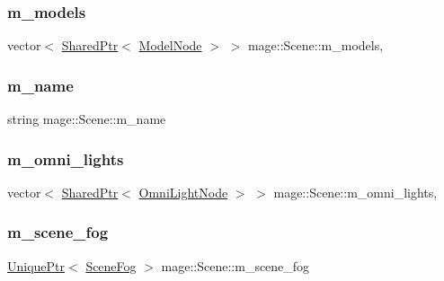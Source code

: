 \subsubsection{\texorpdfstring{m\+\_\+models}{m\_models}}
{\footnotesize\ttfamily vector$<$ \hyperlink{namespacemage_a1e01ae66713838a7a67d30e44c67703e}{Shared\+Ptr}$<$ \hyperlink{classmage_1_1_model_node}{Model\+Node} $>$ $>$ mage\+::\+Scene\+::m\+\_\+models\hspace{0.3cm}{\ttfamily [mutable]}, {\ttfamily [private]}}

\hypertarget{classmage_1_1_scene_a6cc8cb08b1853c4e3063b33a94e8fb47}{}\label{classmage_1_1_scene_a6cc8cb08b1853c4e3063b33a94e8fb47} 
\subsubsection{\texorpdfstring{m\+\_\+name}{m\_name}}
{\footnotesize\ttfamily string mage\+::\+Scene\+::m\+\_\+name\hspace{0.3cm}{\ttfamily [private]}}

\hypertarget{classmage_1_1_scene_a881c3dd7e85e5069650f29fd2722bf78}{}\label{classmage_1_1_scene_a881c3dd7e85e5069650f29fd2722bf78} 
\subsubsection{\texorpdfstring{m\+\_\+omni\+\_\+lights}{m\_omni\_lights}}
{\footnotesize\ttfamily vector$<$ \hyperlink{namespacemage_a1e01ae66713838a7a67d30e44c67703e}{Shared\+Ptr}$<$ \hyperlink{namespacemage_a1724c6e6b6b5ba535cdd967cbbb4a669}{Omni\+Light\+Node} $>$ $>$ mage\+::\+Scene\+::m\+\_\+omni\+\_\+lights\hspace{0.3cm}{\ttfamily [mutable]}, {\ttfamily [private]}}

\hypertarget{classmage_1_1_scene_a58f8d29322664c4c5895703a6cbc9000}{}\label{classmage_1_1_scene_a58f8d29322664c4c5895703a6cbc9000} 
\subsubsection{\texorpdfstring{m\+\_\+scene\+\_\+fog}{m\_scene\_fog}}
{\footnotesize\ttfamily \hyperlink{namespacemage_a3316d7143a973e37adf1110f2e80ca31}{Unique\+Ptr}$<$ \hyperlink{structmage_1_1_scene_fog}{Scene\+Fog} $>$ mage\+::\+Scene\+::m\+\_\+scene\+\_\+fog\hspace{0.3cm}{\ttfamily [private]}}

